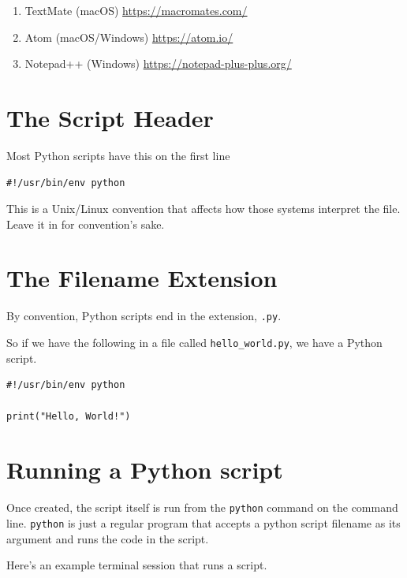 \documentclass[]{book}
\providecommand{\tightlist}{%
  \setlength{\itemsep}{0pt}\setlength{\parskip}{0pt}}
\theoremstyle{definition}
\theoremstyle{definition}
\theoremstyle{definition}
\theoremstyle{remark}
\begin{document}
\begin{enumerate}
\def\labelenumi{\arabic{enumi}.}
\tightlist
\item
  TextMate (macOS) \href{}{https://macromates.com/}
\item
  Atom (macOS/Windows) \href{}{https://atom.io/}
\item
  Notepad++ (Windows) \href{}{https://notepad-plus-plus.org/}
\end{enumerate}

\hypertarget{the-script-header}{%
\section{The Script Header}\label{the-script-header}}

Most Python scripts have this on the first line

\begin{verbatim}
#!/usr/bin/env python
\end{verbatim}

This is a Unix/Linux convention that affects how those systems interpret
the file. Leave it in for convention's sake.

\hypertarget{the-filename-extension}{%
\section{The Filename Extension}\label{the-filename-extension}}

By convention, Python scripts end in the extension, \texttt{.py}.

So if we have the following in a file called \texttt{hello\_world.py},
we have a Python script.

\begin{verbatim}
#!/usr/bin/env python

print("Hello, World!")
\end{verbatim}

\hypertarget{running-a-python-script}{%
\section{Running a Python script}\label{running-a-python-script}}

Once created, the script itself is run from the \texttt{python} command
on the command line. \texttt{python} is just a regular program that
accepts a python script filename as its argument and runs the code in
the script.

Here's an example terminal session that runs a script.
\end{document}
